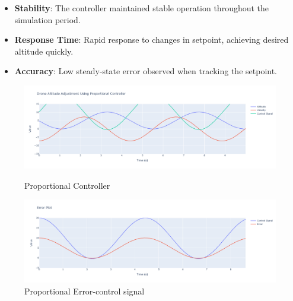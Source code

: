 \documentclass[a4paper,12pt]{article}
\begin{document}
\begin{itemize}
    \item \textbf{Stability}: The controller maintained stable operation throughout the simulation period.
    \item \textbf{Response Time}: Rapid response to changes in setpoint, achieving desired altitude quickly.
    \item \textbf{Accuracy}: Low steady-state error observed when tracking the setpoint.
\end{itemize}
\begin{figure}
    \centering
    \includegraphics[width=1\linewidth,height=0.6
    \linewidth]{photos/proportional.png}
    \caption{Proportional Controller}
    \label{fig:enter-label}
    \centering
    \includegraphics[width=1\linewidth,height=0.6
    \linewidth]{photos/P_Error.png}
    \caption{Proportional Error-control signal}
    \label{fig:enter-label}
    
    
    
\end{figure}
\end{document}
